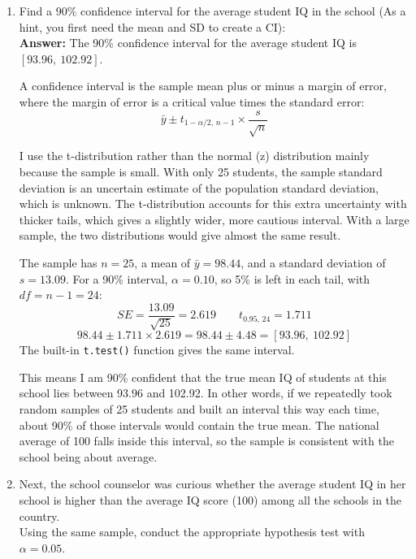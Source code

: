 \documentclass[12pt,letterpaper]{article}
\begin{document}
\begin{enumerate}
	\item Find a 90\% confidence interval for the average student IQ in the school (As a hint, you first need the mean and SD to create a CI):\\
	
	  
	
	\noindent \textbf{Answer:} The 90\% confidence interval for the average student IQ is $[93.96,\ 102.92]$.
	
\noindent A confidence interval is the sample mean plus or minus a margin of error, where the margin of error is a critical value times the standard error:
\[ \bar{y} \pm t_{1-\alpha/2,\, n-1} \times \frac{s}{\sqrt{n}} \]

\noindent I use the t-distribution rather than the normal (z) distribution mainly because the sample is small. With only 25 students, the sample standard deviation is an uncertain estimate of the population standard deviation, which is unknown. The t-distribution accounts for this extra uncertainty with thicker tails, which gives a slightly wider, more cautious interval. With a large sample, the two distributions would give almost the same result.

\noindent The sample has $n = 25$, a mean of $\bar{y} = 98.44$, and a standard deviation of $s = 13.09$. For a 90\% interval, $\alpha = 0.10$, so 5\% is left in each tail, with $df = n - 1 = 24$:
\[ SE = \frac{13.09}{\sqrt{25}} = 2.619 \qquad t_{0.95,\,24} = 1.711 \]
\[ 98.44 \pm 1.711 \times 2.619 = 98.44 \pm 4.48 = [93.96,\ 102.92] \]
The built-in \texttt{t.test()} function gives the same interval.

\noindent This means I am 90\% confident that the true mean IQ of students at this school lies between 93.96 and 102.92. In other words, if we repeatedly took random samples of 25 students and built an interval this way each time, about 90\% of those intervals would contain the true mean. The national average of 100 falls inside this interval, so the sample is consistent with the school being about average.

	\item Next, the school counselor was curious  whether  the average student IQ in her school is higher than the average IQ score (100) among all the schools in the country.\\ 
	
	\noindent Using the same sample, conduct the appropriate hypothesis test with $\alpha=0.05$.
	

\end{enumerate}
\end{document}
